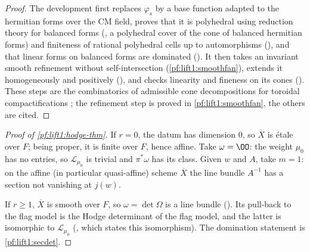 \begin{proof}
The development first replaces $\varphi_s$ by a base function adapted to the hermitian forms over the
CM field, proves that it is polyhedral using reduction theory for balanced forms
(, a polyhedral cover of the cone of
balanced hermitian forms) and finiteness of rational polyhedral cells up to automorphisms
(), and that linear forms on
balanced forms are dominated (). It then
takes an invariant smooth refinement without self-intersection (\cref{pf:lift1:smoothfan}), extends it homogeneously and
positively (), and checks linearity
and fineness on its cones
(). These steps are the combinatorics of
admissible cone decompositions for toroidal compactifications \cite{AshMumfordRapoportTai1975,FaltingsChai1990};
the refinement step is proved in \cref{pf:lift1:smoothfan}, the others are cited.
\end{proof}

\begin{proof}[Proof of \cref{pf:lift1:hodge-thm}]
If $r=0$, the datum has dimension $0$, so $\overline X$ is \'etale over $F$; being proper, it is finite
over $F$, hence affine. Take $\omega=\OO$: the weight $\mu_0$ has no entries, so $\mathcal L_{\mu_0}$ is
trivial and $\pi^*\omega$ has its class. Given $w$ and $A$, take $m=1$: on the affine (in particular
quasi-affine) scheme $\overline X$ the line bundle $A^{-1}$ has a section not vanishing at $j(w)$.

If $r\ge1$, $\overline X$ is smooth over $F$, so $\omega=\det\Omega$ is a line bundle
(). Its pull-back to the flag model is the Hodge
determinant of the flag model, and the latter is isomorphic to $\mathcal L_{\mu_0}$
(, which states this isomorphism). The domination
statement is \cref{pf:lift1:secdet}.
\end{proof}

